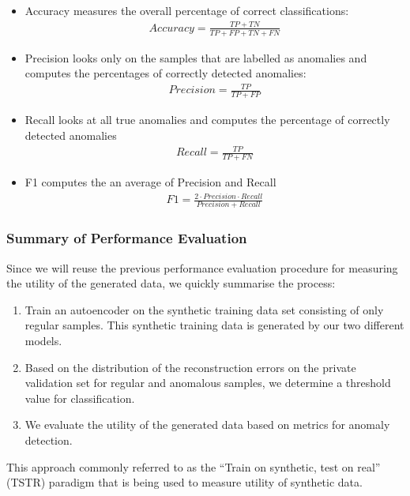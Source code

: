 \begin{itemize}
    \item Accuracy measures the overall percentage of correct classifications:
    \begin{align}
        Accuracy = \frac{TP+TN}{TP+FP+TN+FN}
    \end{align}
    \item Precision looks only on the samples that are labelled as anomalies and computes the percentages of correctly detected anomalies:
    \begin{align}
        Precision = \frac{TP}{TP+FP}
    \end{align}
    \item Recall looks at all true anomalies and computes the percentage of correctly detected anomalies
    \begin{align}
        Recall = \frac{TP}{TP+FN}
    \end{align}
    \item F1 computes the an average of Precision and Recall
    \begin{align}
        F1 = \frac{2\cdot Precision\cdot Recall}{Precision + Recall}
    \end{align}
\end{itemize}

\subsubsection*{Summary of Performance Evaluation}
Since we will reuse the previous performance evaluation procedure for measuring the utility of the generated data, we quickly summarise the process:
\begin{enumerate} \label{list:anom_eval}
    \item Train an autoencoder on the synthetic training data set consisting of only regular samples. This synthetic training data is generated by our two different models.
    \item Based on the distribution of the reconstruction errors on the private validation set for regular and anomalous samples, we determine a threshold value for classification.
    \item We evaluate the utility of the generated data based on metrics for anomaly detection.
\end{enumerate}

This approach commonly referred to as the ``Train on synthetic, test on real'' (TSTR) paradigm \parencite{esteban2017realvalued} that is being used to measure utility of synthetic data.

